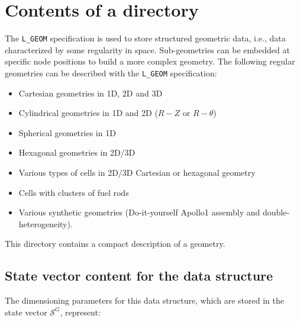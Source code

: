 \section{Contents of a  directory}\label{sect:geometrydir}

The {\tt L\_GEOM} specification is used to store structured geometric data, i.e., data characterized by some regularity in space. Sub-geometries can be embedded at specific node positions to build a more complex geometry. The following regular geometries can be described with the {\tt L\_GEOM} specification:
\begin{itemize}
\item Cartesian geometries in 1D, 2D and 3D
\item Cylindrical geometries in 1D and 2D ($R-Z$ or $R-\theta$)
\item Spherical geometries in 1D
\item Hexagonal geometries in 2D/3D
\item Various types of cells in 2D/3D Cartesian or hexagonal geometry
\item Cells with clusters of fuel rods
\item Various synthetic geometries (Do-it-yourself Apollo1 assembly and double-heterogeneity).
\end{itemize}

This directory contains a compact description of a geometry.

\subsection{State vector content for the  data structure}\label{sect:geometrystate}

The dimensioning parameters for this data structure, which are stored in the state vector
$\mathcal{S}^{G}$, represent:

